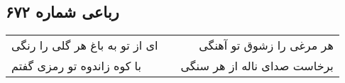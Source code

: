 \begin{center}
\section*{رباعی شماره ۶۷۲}
\label{sec:sh672}
\begin{longtable}{l p{0.5cm} r}
ای از تو به باغ هر گلی را رنگی
&&
هر مرغی را زشوق تو آهنگی
\\
با کوه زاندوه تو رمزی گفتم
&&
برخاست صدای ناله از هر سنگی
\\
\end{longtable}
\end{center}
